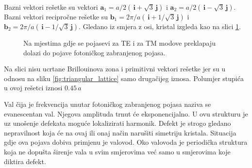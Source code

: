 \documentclass[utf8, seminar, numeric]{fer}
\begin{document}
Bazni vektori rešetke su vektori
${\mathbf{a}_1 = a/2 ( \, \mathbf{i} + \sqrt{3} \, \mathbf{j})}$ i
${\mathbf{a}_2 = a/2 ( \, \mathbf{i} - \sqrt{3} \, \mathbf{j})}$.
Bazni vektori recipročne rešetke su
${\mathbf{b}_1 = 2 \pi/a( \, \mathbf{i} + 1/\sqrt{3} \, \mathbf{j})}$ i
${\mathbf{b}_2 = 2 \pi/a( \, \mathbf{i} - 1/\sqrt{3} \, \mathbf{j})}$.
Gledano iz smjera z osi, kristal izgleda kao na slici
\ref{fig:triangular_lattice_holes}.

\begin{figure}[ht]
\centering
    \qquad
	\caption{Na mjestima gdje se pojasevi za TE i za TM modove preklapaju dolazi
	do pojave fotoničkog zabranjenog pojasa.}
	\label{fig:triangular_lattice_holes}
\end{figure}

Na slici nisu ucrtane Brillouinova zona i primitivni vektori rešetke jer su u
odnosu na sliku \ref{fig:triangular_lattice} samo drugačijeg iznosa. Polumjer
stupića u ovoj rešetci iznosi ${0.45 \, a}$

\FloatBarrier

Val čija je frekvencija unutar fotoničkog zabranjenog pojasa naziva se
evanescentan val.
Njegova amplituda trnut će eksponencijalno. U ovu strukturu je uz unošenje
defekata moguće lokalizirati harmonik. Defekt je strogo gledano nepravilnost
koja će na ovaj ili onaj način narušiti simetriju kristala. Situacija gdje ova
pojava dobiva primjenu je valovod. Oko valovoda je periodička struktura koja
ne dopušta širenje vala u svim smjerovima već samo u smjerovima koje diktira
defekt.
\end{document}
